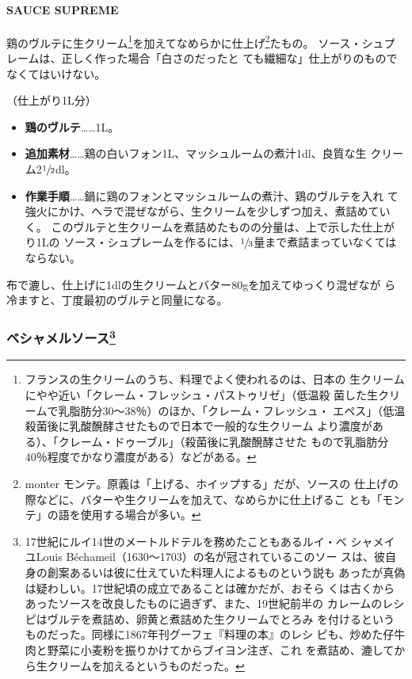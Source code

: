 \documentclass[twoside,12Q,b5j]{escoffierltjsbook}
\begin{document}
\paragraph{SAUCE SUPREME}\label{sauce-supreme}


鶏のヴルテに生クリーム\footnote{フランスの生クリームのうち、料理でよく使われるのは、日本の
  生クリームにやや近い「クレーム・フレッシュ・パストゥリゼ」（低温殺
  菌した生クリームで乳脂肪分30〜38％）のほか、「クレーム・フレッシュ・
  エペス」（低温殺菌後に乳酸醗酵させたもので日本で一般的な生クリーム
  より濃度がある）、「クレーム・ドゥーブル」（殺菌後に乳酸醗酵させた
  もので乳脂肪分40％程度でかなり濃度がある）などがある。}を加えてなめらかに仕上げ\footnote{monter
  モンテ。原義は「上げる、ホイップする」だが、ソースの
  仕上げの際などに、バターや生クリームを加えて、なめらかに仕上げるこ
  とも「モンテ」の語を使用する場合が多い。}たもの。
ソース・シュプレームは、正しく作った場合「白さのだったと
ても繊細な」仕上がりのものでなくてはいけない。

（仕上がり1L分）

\begin{itemize}
\item
  \textbf{鶏のヴルテ}\ldots{}\ldots{}1L。
\item
  \textbf{追加素材}\ldots{}\ldots{}鶏の白いフォン1L、マッシュルームの煮汁1dl、良質な生
  クリーム2\(\sfrac{1}{2}\)dl。
\item
  \textbf{作業手順}\ldots{}\ldots{}鍋に鶏のフォンとマッシュルームの煮汁、鶏のヴルテを入れ
  て強火にかけ、ヘラで混ぜながら、生クリームを少しずつ加え、煮詰めていく。
  このヴルテと生クリームを煮詰めたものの分量は、上で示した仕上がり1Lの
  ソース・シュプレームを作るには、\(\sfrac{1}{3}\)量まで煮詰まっていなくてはならない。
\end{itemize}

布で漉し、仕上げに1dlの生クリームとバター80gを加えてゆっくり混ぜなが
ら冷ますと、丁度最初のヴルテと同量になる。

\vspace*{1.7\zw}

\subsubsection[ベシャメルソース]{\texorpdfstring{ベシャメルソース\footnote{17世紀にルイ14世のメートルドテルを務めたこともあるルイ・ベ
  シャメイユLouis Béchameil（1630〜1703）の名が冠されているこのソー
  スは、彼自身の創案あるいは彼に仕えていた料理人によるものという説も
  あったが真偽は疑わしい。17世紀頃の成立であることは確かだが、おそら
  くは古くからあったソースを改良したものに過ぎず、また、19世紀前半の
  カレームのレシピはヴルテを煮詰め、卵黄と煮詰めた生クリームでとろみ
  を付けるというものだった。同様に1867年刊グーフェ『料理の本』のレシ
  ピも、炒めた仔牛肉と野菜に小麦粉を振りかけてからブイヨン注ぎ、これ
  を煮詰め、漉してから生クリームを加えるというものだった。}}{ベシャメルソース}}\label{ux30d9ux30b7ux30e3ux30e1ux30ebux30bdux30fcux30b9102020}
\end{document}
